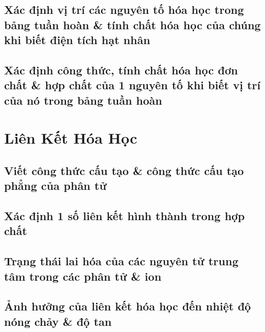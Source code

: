 \documentclass{article}
\numberwithin{equation}{section}
\begin{document}
\subsection{Xác định vị trí các nguyên tố hóa học trong bảng tuần hoàn \& tính chất hóa học của chúng khi biết điện tích hạt nhân}


\subsection{Xác định công thức, tính chất hóa học đơn chất \& hợp chất của 1 nguyên tố khi biết vị trí của nó trong bảng tuần hoàn}


\section{Liên Kết Hóa Học}

\subsection{Viết công thức cấu tạo \& công thức cấu tạo phẳng của phân tử}


\subsection{Xác định 1 số liên kết hình thành trong hợp chất}


\subsection{Trạng thái lai hóa của các nguyên tử trung tâm trong các phân tử \& ion}


\subsection{Ảnh hưởng của liên kết hóa học đến nhiệt độ nóng chảy \& độ tan}
\end{document}
